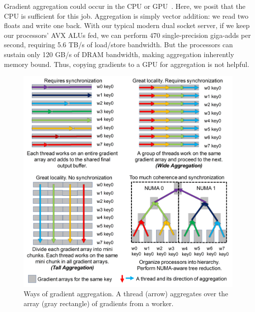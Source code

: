 Gradient aggregation could occur in the CPU or GPU~\cite{GeePS}. Here, we posit that the CPU is sufficient for this job.
Aggregation is simply vector addition: we read two floats and write one back.
With our typical modern dual socket server, if we keep our processors' AVX ALUs fed, we can perform 470 single-precision giga-adds per second, requiring 5.6 TB/s of load/store bandwidth.
But the processors can sustain only 120 GB/s of DRAM bandwidth, making aggregation inherently memory bound. Thus, copying gradients to a GPU for aggregation is not helpful.

\begin{figure}[t!]
    \centering
	\includegraphics[width=.7\linewidth,trim=5 5 15 5,clip]{Figures/AggregationExperiments.jpg}
	\caption{Ways of gradient aggregation. A thread (arrow) aggregates over the array (gray rectangle) of gradients from a worker. }
	\label{fig:gradientAggregation}
\end{figure}


